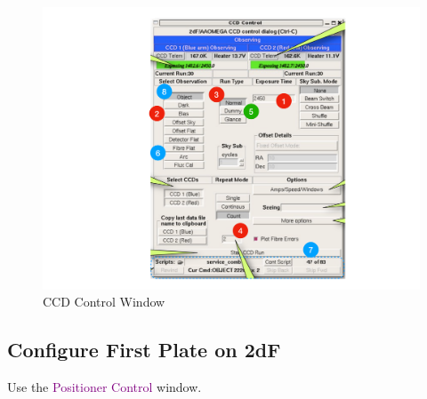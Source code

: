 \documentclass[12pt]{article}
\begin{document}
\begin{figure}
\begin{center}
\includegraphics[scale=0.8]{CCDControlWindow.pdf}
\caption{CCD Control Window}
\label{fig:CCD}
\end{center}
\end{figure}

\subsection{Configure First Plate on 2dF}

\vspace{5mm}


{\large \textsf{Use the {\textcolor{purple}{Positioner Control}} window.}}
\end{document}
